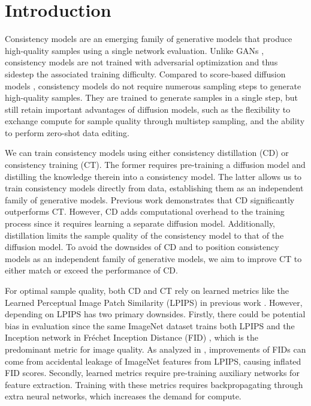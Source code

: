 \section{Introduction}

\thispagestyle{empty}


Consistency models \citep{song2023consistency} are an emerging family of generative models that produce high-quality samples using a single network evaluation. Unlike GANs \citep{goodfellow2014generative}, consistency models are not trained with adversarial optimization and thus sidestep the associated training difficulty. Compared to score-based diffusion models \citep{sohl2015deep,song2019generative,song2020improved,ho2020denoising,song2021scorebased}, consistency models do not require numerous sampling steps to generate high-quality samples. They are trained to generate samples in a single step, but still retain important advantages of diffusion models, such as the flexibility to exchange compute for sample quality through multistep sampling, and the ability to perform zero-shot data editing.

We can train consistency models using either consistency distillation (CD) or consistency training (CT). The former requires pre-training a diffusion model and distilling the knowledge therein into a consistency model. The latter allows us to train consistency models directly from data, establishing them as an independent family of generative models. Previous work \citep{song2023consistency} demonstrates that CD significantly outperforms CT. However, CD adds computational overhead to the training process since it requires learning a separate diffusion model. Additionally, distillation limits the sample quality of the consistency model to that of the diffusion model. To avoid the downsides of CD and to position consistency models as an independent family of generative models, we aim to improve CT to either match or exceed the performance of CD.

For optimal sample quality, both CD and CT rely on learned metrics like the Learned Perceptual Image Patch Similarity (LPIPS) \citep{zhang2018unreasonable} in previous work \citep{song2023consistency}. However, depending on LPIPS has two primary downsides. Firstly, there could be potential bias in evaluation since the same ImageNet dataset \citep{deng2009imagenet} trains both LPIPS and the Inception network in Fr\'echet Inception Distance (FID) \citep{heusel2017gans}, which is the predominant metric for image quality. As analyzed in \citet{kynkanniemi2023the}, improvements of FIDs can come from accidental leakage of ImageNet features from LPIPS, causing inflated FID scores. Secondly, learned metrics require pre-training auxiliary networks for feature extraction. Training with these metrics requires backpropagating through extra neural networks, which increases the demand for compute.

